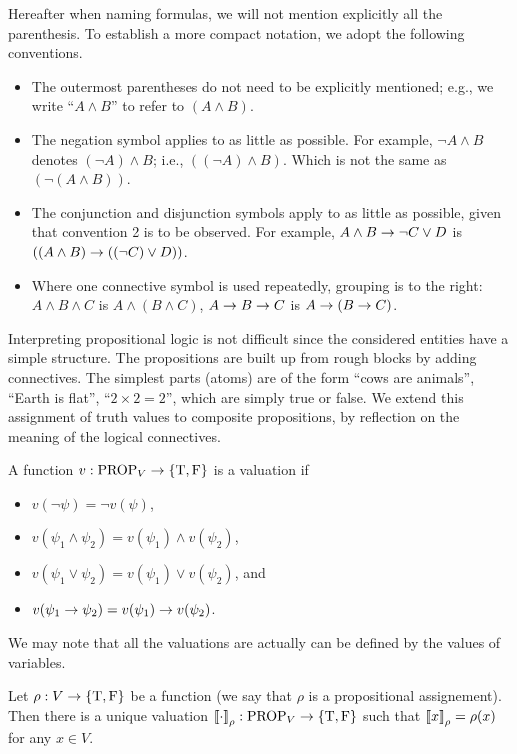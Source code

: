 Hereafter when naming formulas, we will not mention explicitly all the
parenthesis. To establish a more compact notation, we adopt the following
conventions.
\begin{itemize}
  \item The outermost parentheses do not need to be explicitly mentioned; e.g.,
    we write ``$A \land B$'' to refer to $(A \land B)$.
  \item The negation symbol applies to as little as possible.
    For example, $\lnot A \land B$ denotes $(\lnot A) \land B$;
    i.e., $((\lnot A) \land B)$. Which is not the same as
    $(\lnot (A \land B))$.
  \item The conjunction and disjunction symbols apply to as little as possible,
    given that convention 2 is to be observed. For example,
    $A \land B \rightarrow \lnot C \lor D$ is
    $((A \land B) \rightarrow ((\lnot C) \lor D))$.
  \item Where one connective symbol is used repeatedly, grouping is to the
    right: $A \land B \land C$ is $A \land (B \land C)$,
    $A \rightarrow B \rightarrow C$ is $A \rightarrow (B \rightarrow C)$.
\end{itemize}

Interpreting propositional logic is not difficult since the considered entities
have a simple structure. The propositions are built up from rough blocks by
adding connectives. The simplest parts (atoms) are of the form ``cows are
animals'', ``Earth is flat'', ``$2 \times 2 = 2$'', which are simply true or
false. We extend this assignment of truth values to composite propositions, by
reflection on the meaning of the logical connectives.

\begin{definition}
  A function $v : \prop{V} \to \set{\ltrue, \lfalse}$ is a valuation if
  \begin{itemize}
    \item $v(\lnot \psi) = \lnot v(\psi)$,
    \item $v(\psi_1 \land \psi_2) = v(\psi_1) \land v(\psi_2)$,
    \item $v(\psi_1 \lor \psi_2) = v(\psi_1) \lor v(\psi_2)$, and
    \item $v(\psi_1 \rightarrow \psi_2) = v(\psi_1) \rightarrow v(\psi_2)$.
  \end{itemize}
\end{definition}

We may note that all the valuations are actually can be defined by the values
of variables.
\begin{theorem}
  Let $\rho : V \to \set{\ltrue, \lfalse}$ be a function (we say that $\rho$ is
  a propositional assignement). Then there is a unique valuation
  $\substitute{\cdot}{\rho} : \prop{V} \to \set{\ltrue, \lfalse}$ such that
  $\left\llbracket {x} \right\rrbracket_{\rho} = \rho(x)$ for any $x \in V$.
\end{theorem}


